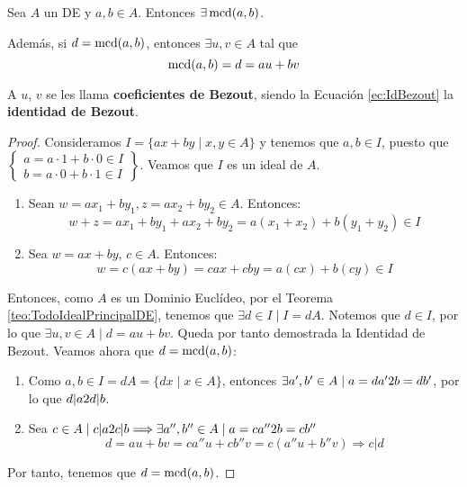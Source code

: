 \begin{coro} \label{cor:DEExistemcdyBezout}
    Sea $A$ un DE y $a,b \in A$. Entonces $\exists \operatorname{mcd}(a,b)$.
    
    Además, si $d=\operatorname{mcd}(a,b)$, entonces $\exists u,v \in A$ tal que
    \begin{equation}\label{ec:IdBezout}
        \operatorname{mcd}(a,b) = d = au + bv
    \end{equation}
    
    A $u$, $v$ se les llama \textbf{coeficientes de Bezout}, siendo la Ecuación \ref{ec:IdBezout} la \textbf{identidad de Bezout}.
\end{coro}
\begin{proof}
    Consideramos $I = \{ax+by \mid x,y \in A\}$ y tenemos que $a, b\in I$, puesto que $\left\{\begin{array}{l}
         a = a\cdot 1 + b \cdot 0 \in I \\
         b = a\cdot 0 + b \cdot 1 \in I
    \end{array}\right\}$. Veamos que $I$ es un ideal de $A$.
    \begin{enumerate}
        \item Sean $w=ax_1 +by_1, z=ax_2+by_2\in A$. Entonces:
        $$ w+z = ax_1 + by_1 + ax_2 + by_2 = a(x_1 + x_2) + b(y_1+y_2) \in I$$

        \item Sea $w=ax+by$, $c \in A$. Entonces:
        $$w = c(ax+by) = cax + cby = a(cx) + b(cy) \in I$$
    \end{enumerate}
    
    Entonces, como $A$ es un Dominio Euclídeo, por el Teorema \ref{teo:TodoIdealPrincipalDE}, tenemos que $\exists d \in I \mid I = dA$.
    Notemos que $d\in I$, por lo que $\exists u,v \in A \mid d=au+bv$. Queda por tanto demostrada la Identidad de Bezout. Veamos ahora que $d=\operatorname{mcd}(a,b)$:
    \begin{enumerate}
        \item Como $a,b \in I =dA = \{dx \mid x \in A\}$, entonces $\exists a', b' \in A \mid a=da' 2 b=db'$, por lo que $d|a 2 d|b$.

        \item Sea $c \in A \mid c|a 2 c|b \Longrightarrow \exists a'', b'' \in A \mid a=ca'' 2 b=cb''$
        $$d=au+bv = ca''u + cb''v = c(a'' u + b''v) \Longrightarrow c|d$$  
    \end{enumerate}
    
    Por tanto, tenemos que $d = \operatorname{mcd}(a,b)$.
\end{proof}

